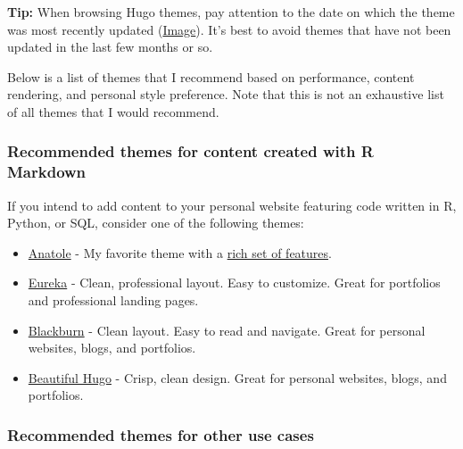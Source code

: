 \documentclass[
]{book}
\begin{document}
\textbf{Tip:} When browsing Hugo themes, pay attention to the date on which the theme was most recently updated (\href{https://i.imgur.com/fp7WH6s.png}{Image}). It's best to avoid themes that have not been updated in the last few months or so.

Below is a list of themes that I recommend based on performance, content rendering, and personal style preference. Note that this is not an exhaustive list of all themes that I would recommend.

\hypertarget{recommended-themes-for-content-created-with-r-markdown}{%
\subsubsection*{Recommended themes for content created with R Markdown}\label{recommended-themes-for-content-created-with-r-markdown}}

If you intend to add content to your personal website featuring code written in R, Python, or SQL, consider one of the following themes:

\begin{itemize}
\item
  \href{https://themes.gohugo.io/anatole/}{Anatole} - My favorite theme with a \protect\hyperlink{anatole}{rich set of features}.
\item
  \href{https://themes.gohugo.io/hugo-eureka/}{Eureka} - Clean, professional layout. Easy to customize. Great for portfolios and professional landing pages.
\item
  \href{https://themes.gohugo.io/blackburn/}{Blackburn} - Clean layout. Easy to read and navigate. Great for personal websites, blogs, and portfolios.
\item
  \href{https://themes.gohugo.io/beautifulhugo/}{Beautiful Hugo} - Crisp, clean design. Great for personal websites, blogs, and portfolios.
\end{itemize}

\hypertarget{recommended-themes-for-other-use-cases}{%
\subsubsection*{Recommended themes for other use cases}\label{recommended-themes-for-other-use-cases}}
\end{document}
